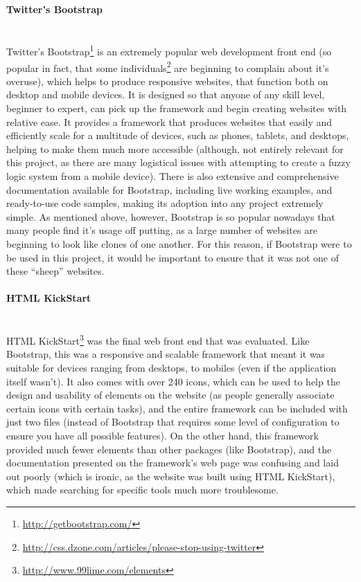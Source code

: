 \paragraph{Twitter's Bootstrap}\ \\
Twitter's Bootstrap\footnote{\url{http://getbootstrap.com/}} is an extremely popular web development front end (so popular in fact, that some individuals\footnote{\url{http://css.dzone.com/articles/please-stop-using-twitter}} are beginning to complain about it's overuse), which helps to produce responsive websites, that function both on  desktop and mobile devices. It is designed so that anyone of any skill level, beginner to expert, can pick up the framework and begin creating websites with relative ease. It provides a framework that produces websites that easily and efficiently scale for a multitude of devices, such as phones, tablets, and desktops, helping to make them much more accessible (although, not entirely relevant for this project, as there are many logistical issues with attempting to create a fuzzy logic system from a mobile device). There is also extensive and comprehensive documentation available for Bootstrap, including live working examples, and ready-to-use code samples, making its adoption into any project extremely simple. As mentioned above, however, Bootstrap is so popular nowadays that many people find it's usage off putting, as a large number of websites are beginning to look like clones of one another. For this reason, if Bootstrap were to be used in this project, it would be important to ensure that it was not one of these ``sheep'' websites.	

\paragraph{HTML KickStart}\ \\
HTML KickStart\footnote{\url{http://www.99lime.com/elements}} was the final web front end that was evaluated. Like Bootstrap, this was a responsive and scalable framework that meant it was suitable for devices ranging from desktops, to mobiles (even if the application itself wasn't). It also comes with over 240 icons, which can be used to help the design and usability of elements on the website (as people generally associate certain icons with certain tasks), and the entire framework can be included with just two files (instead of Bootstrap that requires some level of configuration to ensure you have all possible features). On the other hand, this framework provided much fewer elements than other packages (like Bootstrap), and the documentation presented on the framework's web page was confusing and laid out poorly (which is ironic, as the website was built using HTML KickStart), which made searching for specific tools much more troublesome. 

